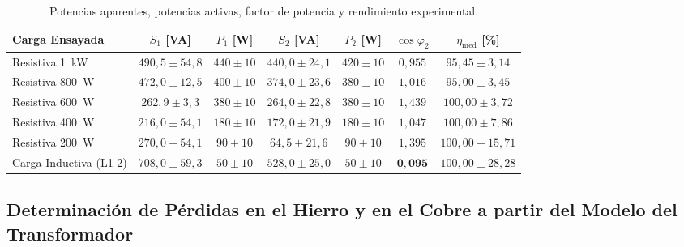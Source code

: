 \begin{table}[htbp]
    \centering
    \caption{Potencias aparentes, potencias activas, factor de potencia y rendimiento experimental.}
    \label{tab:potencias_rendimiento}
    \begin{tabular}{l c c c c c c}
        \toprule
        \textbf{Carga Ensayada} & \textbf{$S_1$ [VA]} & \textbf{$P_1$ [W]} & \textbf{$S_2$ [VA]} & \textbf{$P_2$ [W]} & \textbf{$\cos\varphi_2$} & \textbf{$\eta_{\text{med}}$ [\%]} \\
        \midrule
        Resistiva 1~kW & $490{,}5 \pm 54{,}8$ & $440 \pm 10$ & $440{,}0 \pm 24{,}1$ & $420 \pm 10$ & $0{,}955$ & $95{,}45 \pm 3{,}14$ \\
        Resistiva 800~W & $472{,}0 \pm 12{,}5$ & $400 \pm 10$ & $374{,}0 \pm 23{,}6$ & $380 \pm 10$ & $1{,}016$ & $95{,}00 \pm 3{,}45$ \\
        Resistiva 600~W & $262{,}9 \pm 3{,}3$ & $380 \pm 10$ & $264{,}0 \pm 22{,}8$ & $380 \pm 10$ & $1{,}439$ & $100{,}00 \pm 3{,}72$ \\
        Resistiva 400~W & $216{,}0 \pm 54{,}1$ & $180 \pm 10$ & $172{,}0 \pm 21{,}9$ & $180 \pm 10$ & $1{,}047$ & $100{,}00 \pm 7{,}86$ \\
        Resistiva 200~W & $270{,}0 \pm 54{,}1$ & $90 \pm 10$ & $64{,}5 \pm 21{,}6$ & $90 \pm 10$ & $1{,}395$ & $100{,}00 \pm 15{,}71$ \\
        \midrule
        Carga Inductiva (L1-2) & $708{,}0 \pm 59{,}3$ & $50 \pm 10$ & $528{,}0 \pm 25{,}0$ & $50 \pm 10$ & $\mathbf{0{,}095}$ & $100{,}00 \pm 28{,}28$ \\
        \bottomrule
    \end{tabular}
\end{table}

\subsection{Determinación de Pérdidas en el Hierro y en el Cobre a partir del Modelo del Transformador}

